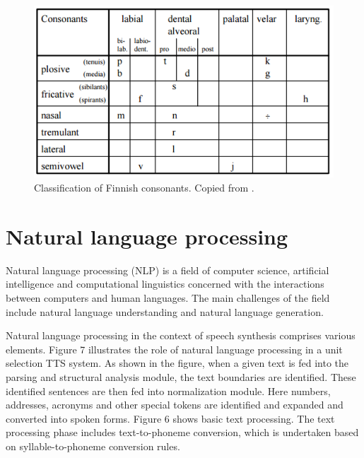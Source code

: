 \documentclass[11pt,a4paper,oneside,article]{memoir}
\begin{document}
\begin{figure}[h]
  \includegraphics[width=14cm]{consonants}
  \caption{Classification of Finnish consonants. Copied from \cite{hut}.}
  \label{fig:consonants}
\end{figure}



\section{Natural language processing}
Natural language processing (NLP) is a field of computer science, artificial intelligence and computational linguistics concerned with the interactions between computers and human languages. The main challenges of the field include natural language understanding and natural language generation.

Natural language processing in the context of speech synthesis comprises various elements. Figure 7 illustrates the role of natural language processing in a unit selection TTS system. As shown in the figure, when a given text is fed into the parsing and structural analysis module, the text boundaries are identified. These identified sentences are then fed into normalization module. Here numbers, addresses, acronyms and other special tokens are identified and expanded and converted into spoken forms.  Figure 6 shows basic text processing. The text processing phase includes text-to-phoneme conversion, which is undertaken based on syllable-to-phoneme conversion rules. \cite{chala}
\end{document}
